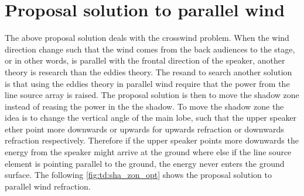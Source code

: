 





\section{Proposal solution to parallel wind}\label{sec:des:pro_para}
The above proposal solution deals with the crosswind problem. When the wind direction change such that the wind comes from the back audiences to the stage, or in other words, is parallel with the frontal direction of the speaker, another theory is research than the eddies theory. The resand to search another solution is that using the eddies theory in parallel wind require that the power from the line source array is raised. The proposal solution is then to move the shadow zone instead of reasing the power in the the shadow. To move the shadow zone the idea is to change the vertical angle of the main lobe, such that the upper speaker ether point more downwards or upwards for upwards refraction or downwards refraction respectively. Therefore if the upper speaker points more downwards the energy from the speaker might arrive at the ground where else if the line source element is pointing parallel to the ground, the energy never enters the ground surface. The following \autoref{fig:td:sha_zon_opt} shows the proposal solution to parallel wind refraction.  

